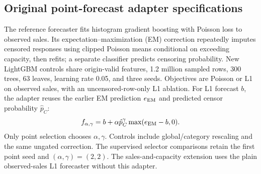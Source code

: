 \subsection{Original point-forecast adapter specifications}\label{app:original-adapter}
The reference forecaster fits histogram gradient boosting with Poisson loss to observed sales. Its expectation--maximization (EM) correction repeatedly imputes censored responses using clipped Poisson means conditional on exceeding capacity, then refits; a separate classifier predicts censoring probability. New LightGBM controls share origin-valid features, 1.2 million sampled rows, 300 trees, 63 leaves, learning rate 0.05, and three seeds. Objectives are Poisson or L1 on observed sales, with an uncensored-row-only L1 ablation. For L1 forecast $b$, the adapter reuses the earlier EM prediction $e_{\rm EM}$ and predicted censor probability $\hat p_C$:
\begin{equation}
 f_{\alpha,\gamma}=b+\alpha\hat p_C^\gamma\max(e_{\rm EM}-b,0).
 \label{eq:adapter}
\end{equation}
Only point selection chooses $\alpha,\gamma$. Controls include global/category rescaling and the same ungated correction. The supervised selector comparisons retain the first point seed and $(\alpha,\gamma)=(2,2)$. The sales-and-capacity extension uses the plain observed-sales L1 forecaster without this adapter.

